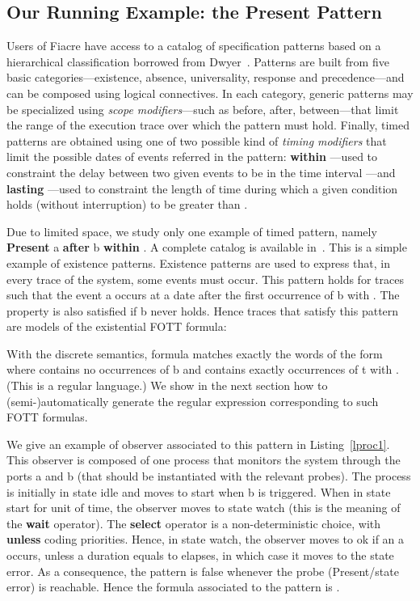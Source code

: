 \documentclass[a4paper]{scrartcl}
\def\code#1{\textsf{\small\bfseries #1}}
\def\vars#1{\textsf{\small #1}}
\begin{document}
\subsection{Our Running Example: the Present Pattern}
Users of Fiacre have access to a catalog of specification patterns
based on a hierarchical classification borrowed from
Dwyer~\cite{ksu}. Patterns are built from five basic
categories---existence, absence, universality, response and
precedence---and can be composed using logical connectives.  In each
category, generic patterns may be specialized using \emph{scope
  modifiers}---such as before, after, between---that limit the range
of the execution trace over which the pattern must hold. Finally,
timed patterns are obtained using one of two possible kind of
\emph{timing modifiers} that limit the possible dates of events
referred in the pattern: \textbf{within }---used to constraint the
delay between two given events to be in the time interval ---and
\textbf{lasting }---used to constraint the length of time during
which a given condition holds (without interruption) to be greater
than . 

Due to limited space, we study only one example of timed pattern,
namely {\code{Present} \vars{a} \code{after} \vars{b} \code{within}
  }. A complete catalog is available in~\cite{FRP11}.
This is a simple example of {existence} patterns. Existence patterns
are used to express that, in every trace of the system, some events
must occur.  This pattern holds for traces such that the event
\vars{a} occurs at a date  after the first occurrence of \vars{b}
with . The property is also satisfied if \vars{b}
never holds. Hence traces  that satisfy this pattern are
models of the existential FOTT formula:




With the discrete semantics, formula  matches
exactly the words of the form  where  contains no occurrences of \vars{b} and 
contains exactly  occurrences of \vars{t} with . (This is a regular language.) We show in the next section how
to (semi-)automatically generate the regular expression corresponding
to such FOTT formulas.

We give an example of observer associated to this pattern in
Listing~\ref{lproc1}. This observer is composed of one process that
monitors the system through the ports \vars{a} and \vars{b} (that
should be instantiated with the relevant probes). The process is
initially in state \vars{idle} and moves to \vars{start} when \vars{b}
is triggered. When in state \vars{start} for  unit of time, the
observer moves to state \vars{watch} (this is the meaning of the
\code{wait} operator). The \code{select} operator is a
non-deterministic choice, with \code{unless} coding priorities. Hence,
in state \vars{watch}, the observer moves to \vars{ok} if an \vars{a}
occurs, unless a duration equals to  elapses, in which case
it moves to the state \vars{error}. As a consequence, the pattern is
false whenever the probe \vars{(Present/state error)} is
reachable. Hence the formula associated to the pattern is .
\end{document}
